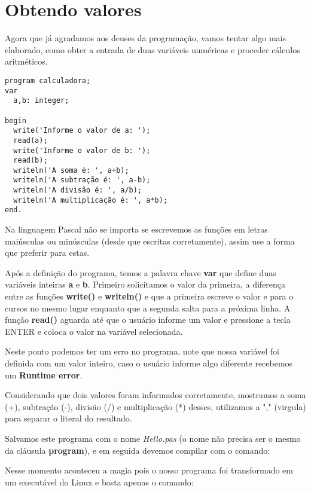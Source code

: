\section{Obtendo valores}
Agora que já agradamos aos deuses da programação, vamos tentar algo mais elaborado, como obter a entrada de duas variáveis numéricas e proceder cálculos aritméticos.

\begin{lstlisting}[]
program calculadora;
var 
  a,b: integer;

begin
  write('Informe o valor de a: ');
  read(a);
  write('Informe o valor de b: ');
  read(b);
  writeln('A soma é: ', a+b);
  writeln('A subtração é: ', a-b);
  writeln('A divisão é: ', a/b);
  writeln('A multiplicação é: ', a*b);
end.
\end{lstlisting}

Na linguagem Pascal não se importa se escrevemos as funções em letras maiúsculas ou minúsculas (desde que escritas corretamente), assim use a forma que preferir para estas.

Após a definição do programa, temos a palavra chave \textbf{var} que define duas variáveis inteiras \textbf{a} e \textbf{b}. Primeiro solicitamos o valor da primeira, a diferença entre as funções \textbf{write()} e \textbf{writeln()} e que a primeira escreve o valor e para o cursos no mesmo lugar enquanto que a segunda salta para a próxima linha. A função \textbf{read()} aguarda até que o usuário informe um valor e pressione a tecla ENTER e coloca o valor na variável selecionada.

Neste ponto podemos ter um erro no programa, note que nossa variável foi definida com um valor inteiro, caso o usuário informe algo diferente recebemos um \textbf{Runtime error}.

Considerando que dois valores foram informados corretamente, mostramos a soma (+), subtração (-), divisão (/) e multiplicação (*) desses, utilizamos a "," (virgula) para separar o literal do resultado.

Salvamos este programa com o nome \textit{Hello.pas} (o nome não precisa ser o mesmo da cláusula \textbf{program}), e em seguida devemos compilar com o comando: \\

Nesse momento aconteceu a magia pois o nosso programa foi transformado em um executável do Linux e basta apenas o comando: \\

